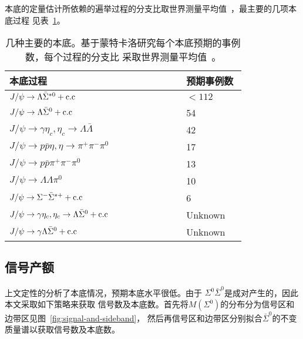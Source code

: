 本底的定量估计所依赖的遍举过程的分支比取世界测量平均值~\cite{PDG}，最主要的几项本底过程
见表~\ref{tab:background}。
\begin{table}[htbp]
    \caption{%
        几种主要的本底。基于蒙特卡洛研究每个本底预期的事例数，每个过程的分支比
        采取世界测量平均值~\cite{PDG}。
    }%
    \label{tab:background}
    \begin{center}
        \begin{tabular} {p{0.6 \linewidth} p{0.2\linewidth}}
            \toprule 
            本底过程  &  预期事例数 \\
            \midrule 
            $J/\psi \to \Lambda \bar{\Sigma}^{*0} +{\rm c.c}$ & $<112$ \\
            $J/\psi \to \Lambda \bar{\Sigma}^{0} + {\rm c.c}$ & 54\\
            $J/\psi \to \gamma \eta_c, \eta_c \to \Lambda \bar{\Lambda}
            $ & 42\\
            $J/\psi \to p \bar{p} \eta, \eta \to \pi^{+} \pi^{-}
            \pi^{0}$ & 17\\

            $J/\psi \to p \bar{p} \pi^{+} \pi^{-} \pi^{0}$ & 13 \\
            $J/\psi \to \Lambda \Lambda \pi^{0}$ & 10 \\
            $J/\psi \to \Sigma^{-} \bar{\Sigma}^{*+} + {\rm c.c}$ & 6 \\

            $J/\psi \to \gamma \eta_c, \eta_c \to \Lambda
            \bar{\Sigma}^{0} + {\rm c.c}$ &  Unknown \\

            $J/\psi \to \gamma  \Lambda
            \bar{\Sigma}^{0} + {\rm c.c}$ &  Unknown \\

            \bottomrule
        \end{tabular}
    \end{center}
\end{table}

\subsection{信号产额}
上文定性的分析了本底情况，预期本底水平很低。由于
$\Sigma^{0}\bar{\Sigma}^{0}$是成对产生的，因此本文采取如下策略来获取
信号数及本底数。首先将$M(\Sigma^{0})$的分布分为信号区和边带区见图~\ref{fig:signal-and-sideband}，
然后再信号区和边带区分别拟合$\bar{\Sigma}^{0}$的不变质量谱以获取信号数及本底数。
